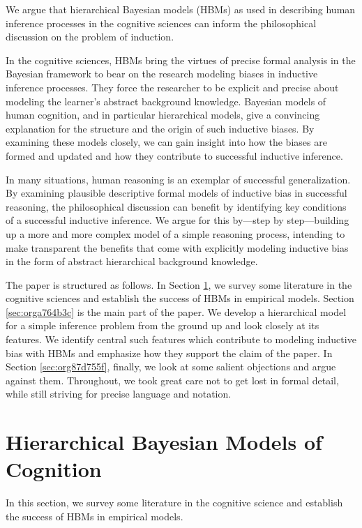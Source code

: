\documentclass[11pt, a4paper]{article}
\begin{document}
We argue that hierarchical Bayesian models (HBMs) as used in describing human
inference processes in the cognitive sciences can inform the philosophical
discussion on the problem of induction.

In the cognitive sciences, HBMs bring the virtues of precise formal analysis in
the Bayesian framework to bear on the research modeling biases in inductive
inference processes. They force the researcher to be explicit and precise about
modeling the learner's abstract background knowledge. Bayesian models of human
cognition, and in particular hierarchical models, give a convincing explanation
for the structure and the origin of such inductive biases. By examining these
models closely, we can gain insight into how the biases are formed and updated
and how they contribute to successful inductive inference.

In many situations, human reasoning is an exemplar of successful generalization.
By examining plausible descriptive formal models of inductive bias in successful
reasoning, the philosophical discussion can benefit by identifying key
conditions of a successful inductive inference. We argue for this by---step by
step---building up a more and more complex model of a simple reasoning process,
intending to make transparent the benefits that come with explicitly modeling
inductive bias in the form of abstract hierarchical background knowledge.

The paper is structured as follows. In Section \ref{sec:org873c88f}, we survey
some literature in the cognitive sciences and establish the success of HBMs in
empirical models. Section \ref{sec:orga764b3c} is the main part of the paper. We
develop a hierarchical model for a simple inference problem from the ground up
and look closely at its features. We identify central such features which
contribute to modeling inductive bias with HBMs and emphasize how they support
the claim of the paper. In Section \ref{sec:org87d755f}, finally, we look at
some salient objections and argue against them. Throughout, we took great care
not to get lost in formal detail, while still striving for precise language and
notation.

\section{Hierarchical Bayesian Models of Cognition}
\label{sec:org873c88f}

In this section, we survey some literature in the cognitive science and establish
the success of HBMs in empirical models.
\end{document}
